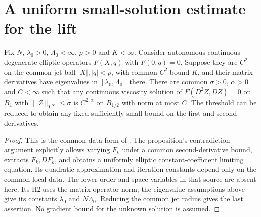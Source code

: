 \section{A uniform small-solution estimate for the lift}

\begin{lemma}\label{lem:savin-family}
Fix $N$, $\lambda_0>0$, $\Lambda_0<\infty$, $\rho>0$ and $K<\infty$.
Consider autonomous continuous degenerate-elliptic operators $F(X,q)$
with $F(0,q)=0$. Suppose they are $C^2$ on the common jet ball
$|X|,|q|<\rho$, with common $C^2$ bound $K$, and their matrix
derivatives have eigenvalues in $[\lambda_0,\Lambda_0]$ there.
There are common $\sigma>0$, $\alpha>0$ and $C<\infty$ such that
any continuous viscosity solution of $F(D^2Z,DZ)=0$ on $B_1$ with
$\|Z\|_{L^\infty}\leq\sigma$ is $C^{2,\alpha}$ on $B_{1/2}$ with
norm at most $C$. The threshold can be reduced to obtain any fixed
sufficiently small bound on the first and second derivatives.
\end{lemma}
\begin{proof}
This is the common-data form of \cite[Theorem 1.3 and
Proposition 4.1, pp. 571--573]{Savin}. The proposition's contradiction
argument explicitly allows varying $F_k$ under a common second-derivative
bound, extracts $F_k,DF_k$, and obtains a uniformly elliptic
constant-coefficient limiting equation. Its quadratic approximation
and iteration constants depend only on the common local data.
The lower-order and space variables in that source are absent here.
Its H2 uses the matrix operator norm; the eigenvalue assumptions above
give its constants $\lambda_0$ and $N\Lambda_0$. Reducing the common
jet radius gives the last assertion. No gradient bound for the unknown
solution is assumed.
\end{proof}

